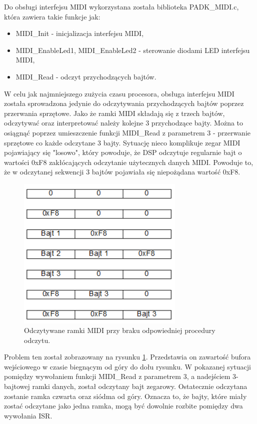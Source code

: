 Do obsługi interfejsu MIDI wykorzystana została biblioteka PADK\_MIDI.c, która zawiera takie funkcje jak:
\begin{itemize}
	\item MIDI\_Init - inicjalizacja interfejsu MIDI,
	\item MIDI\_EnableLed1, MIDI\_EnableLed2 - sterowanie diodami LED interfejsu MIDI,
	\item MIDI\_Read - odczyt przychodzących bajtów. 
\end{itemize}
W celu jak najmniejszego zużycia czasu procesora, obsługa interfejsu MIDI została sprowadzona jedynie do odczytywania przychodzących bajtów poprzez przerwania sprzętowe.
Jako że ramki MIDI składają się z trzech bajtów, odczytywać oraz interpretować należy kolejne 3 przychodzące bajty.
Można to osiągnąć poprzez umieszczenie funkcji MIDI\_Read z parametrem 3 - przerwanie sprzętowe co każde odczytane 3 bajty. Sytuację nieco komplikuje zegar MIDI pojawiający się "losowo", który powoduje, że DSP odczytuje regularnie bajt o wartości 0xF8 zakłócających odczytanie użytecznych danych MIDI. Powoduje to, że w odczytanej sekwencji 3 bajtów pojawiała się niepożądana wartość 0xF8.
\begin{figure}[H]
	\centering
	\includegraphics[width=8cm]{./grafiki/real_nofifo}
	\captionsetup{justification=centering}
	\caption{Odczytywane ramki MIDI przy braku odpowiedniej procedury odczytu.}
	\label{rys:real_nofifo}
\end{figure} 
Problem ten został zobrazowany na rysunku \ref{rys:real_nofifo}. Przedstawia on zawartość bufora wejściowego w czasie biegnącym od góry do dołu rysunku. W pokazanej sytuacji pomiędzy wywołaniem funkcji MIDI\_Read z parametrem 3, a nadejściem 3-bajtowej ramki danych, został odczytany bajt zegarowy. Ostatecznie odczytana zostanie ramka czwarta oraz siódma od góry.  Oznacza to, że bajty, które miały zostać odczytane jako jedna ramka, mogą być dowolnie rozbite pomiędzy dwa wywołania ISR. 
